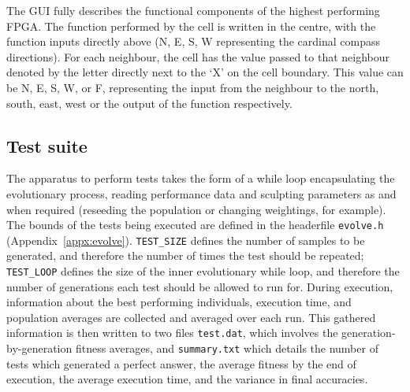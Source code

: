 The GUI fully describes the functional components of the highest performing FPGA. The function performed
by the cell is written in the centre, with the function inputs directly above
(N, E, S, W representing the cardinal compass directions). For each neighbour, the
cell has the value passed to that neighbour denoted by the letter directly
next to the `X' on the cell boundary. This value can be N, E, S, W, or F, representing the input from the
neighbour to the north, south, east, west or the output of the function respectively.

\subsection{Test suite}
The apparatus to perform tests takes the form of a while loop encapsulating the
evolutionary process, reading performance data and sculpting parameters as and when
required (reseeding the population or changing weightings, for example). The
bounds of the tests being executed are defined in the headerfile \texttt{evolve.h}
(Appendix~\ref{appx:evolve}). \texttt{TEST\_SIZE} defines the number of samples
to be generated, and therefore the number of times the test should be repeated;
\texttt{TEST\_LOOP} defines the size of the inner evolutionary while loop, and
therefore the number of generations each test should be allowed to run for.
During execution, information about the best performing individuals, execution time,
and population averages are collected and averaged over each run. This gathered
information is then written to two files \texttt{test.dat}, which involves the
generation-by-generation fitness averages, and \texttt{summary.txt} which details
the number of tests which generated a perfect answer, the average fitness by the
end of execution, the average execution time, and the variance in final accuracies.
